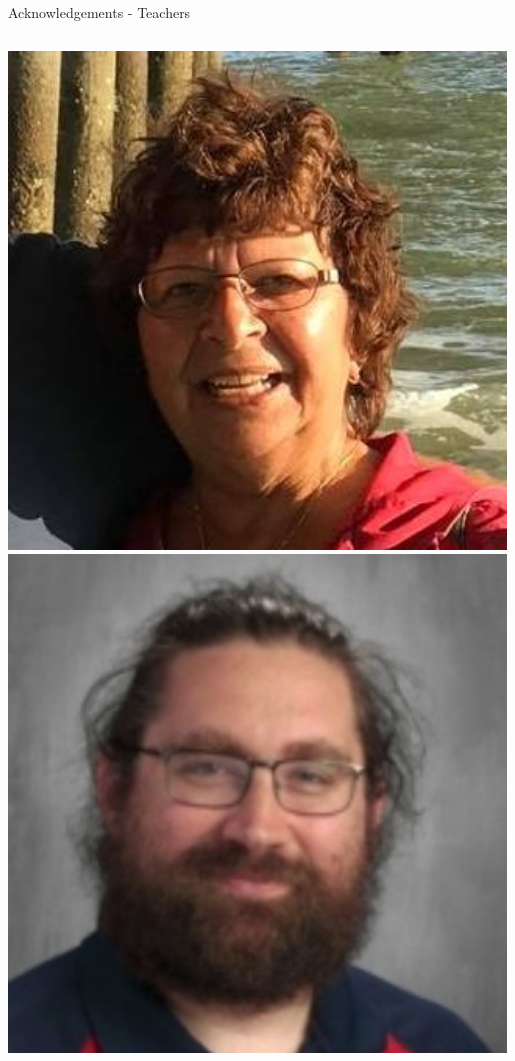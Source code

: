 \documentclass[aspectratio=169]{beamer}
\begin{document}
\begin{frame}{Acknowledgements - Teachers}
\begin{columns}
            \centering
            \includegraphics[width=0.99\textwidth]{people/teachers/rice.png}
            \includegraphics[width=0.99\textwidth]{people/teachers/thompson.png}


\end{columns}
\end{frame}
\end{document}
